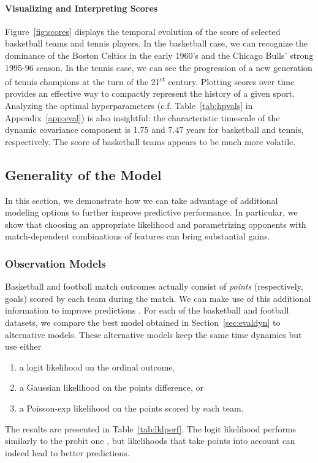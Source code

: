 \paragraph{Visualizing and Interpreting Scores}
Figure~\ref{fig:scores} displays the temporal evolution of the score of selected basketball teams and tennis players.
In the basketball case, we can recognize the dominance of the Boston Celtics in the early 1960's and the Chicago Bulls' strong 1995-96 season.
In the tennis case, we can see the progression of a new generation of tennis champions at the turn of the 21\textsuperscript{st} century.
Plotting scores over time provides an effective way to compactly represent the history of a given sport.
Analyzing the optimal hyperparameters (c.f. Table~\ref{tab:hpvals} in Appendix~\ref{app:eval}) is also insightful: the characteristic timescale of the dynamic covariance component is \num{1.75} and \num{7.47} years for basketball and tennis, respectively.
The score of basketball teams appears to be much more volatile.


\subsection{Generality of the Model}
\label{sec:evalgen}

In this section, we demonstrate how we can take advantage of additional modeling options to further improve predictive performance.
In particular, we show that
choosing an appropriate likelihood and
parametrizing opponents with match-dependent combinations of features
can bring substantial gains.


\subsubsection{Observation Models}
Basketball and football match outcomes actually consist of \emph{points} (respectively, goals) scored by each team during the match.
We can make use of this additional information to improve predictions \citep{maher1982modelling}.
For each of the basketball and football datasets, we compare the best model obtained in Section~\ref{sec:evaldyn} to alternative models.
These alternative models keep the same time dynamics but use either
\begin{enumerate}
	\item a logit likelihood on the ordinal outcome,
	\item a Gaussian likelihood on the points difference, or
	\item a Poisson-exp likelihood on the points scored by each team.
\end{enumerate}
The results are presented in Table~\ref{tab:lklperf}.
The logit likelihood performs similarly to the probit one \citep{stern1992all}, but likelihoods that take points into account can indeed lead to better predictions.

